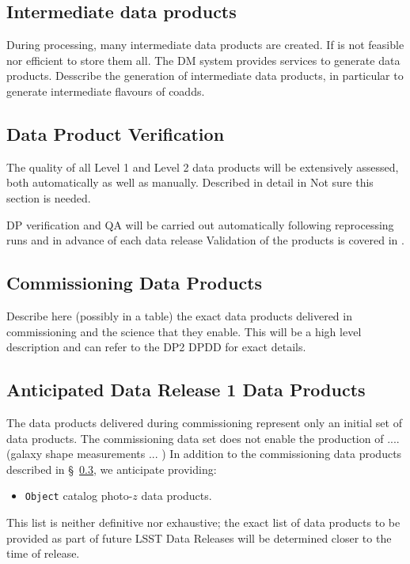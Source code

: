 \subsection{Intermediate data products}
During processing, many intermediate data products are created. If is not feasible nor efficient to store them all. 
The DM system provides services to generate data products. 
Desscribe the generation of intermediate data products, in particular to generate intermediate flavours of coadds. 


\subsection{Data Product Verification}
The quality of all Level 1 and Level 2 data products will be extensively assessed, both automatically as well as manually. 
Described in detail in \cite{pstn-024}
Not sure this section is needed. 

DP verification and QA will be carried out automatically following reprocessing runs and in advance of each data release 
Validation of the products is covered in \cite{PSTN-024}.

\subsection{Commissioning Data Products}  \label{sec:dp-commissioning}
Describe here (possibly in a table) the exact data products delivered in commissioning and the science that they enable. 
This will be a high level description and can refer to the DP2 DPDD for exact details. 

\subsection{Anticipated Data Release 1 Data Products} \label{sec:dp-dr1}

The data products delivered during commissioning represent only an initial set of data products. 
The commissioning data set does not enable the production of .... (galaxy shape measurements ... )
In addition to the commissioning data products described in \S~\ref{sec:dp-commissioning}, we anticipate providing: 

\begin{itemize}
\item {\tt Object} catalog photo-$z$ data products.
\end{itemize}
This list is neither definitive nor exhaustive; the exact list of data products to be provided as part of future LSST Data Releases will be determined closer to the time of release. 

